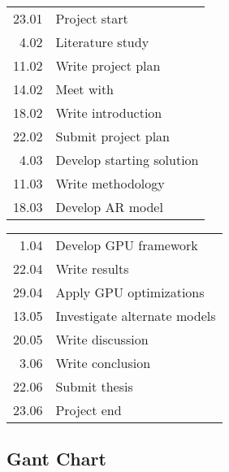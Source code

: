 \documentclass[]{article}
\begin{document}
\begin{multicols}{2}
\begin{tabular}{r|l}
    23.01 & Project start \\
     4.02 & Literature study \\
    11.02 & Write project plan \\
    14.02 & Meet with \citeauthor{jacobsen2018a} \\
    18.02 & Write introduction \\
    22.02 & Submit project plan \\
     4.03 & Develop starting solution \\
    11.03 & Write methodology \\
    18.03 & Develop AR model \\
\end{tabular}

\columnbreak

\begin{tabular}{r|l}
     1.04 & Develop GPU framework \\
    22.04 & Write results \\
    29.04 & Apply GPU optimizations \\
    13.05 & Investigate alternate models \\
    20.05 & Write discussion \\
     3.06 & Write conclusion \\
    22.06 & Submit thesis \\
    23.06 & Project end 
\end{tabular}
\end{multicols}

\subsection*{Gant Chart}
\end{document}
